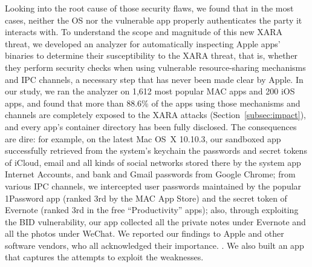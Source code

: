 \documentclass{article}
\newcommand{\ignore}[1]{}
\begin{document}
Looking into the root cause of those security flaws, we found that in the most cases, neither the OS nor the vulnerable app properly authenticates the party it interacts with\ignore{talks to}. To understand the scope and magnitude of this new XARA threat, we developed an analyzer for automatically inspecting Apple apps' binaries to determine their susceptibility to the XARA threat, that is, whether they perform security checks when using vulnerable resource-sharing mechanisms and IPC channels, a necessary step that has never been made clear by Apple. In our study, we ran the analyzer on 1,612 most popular MAC apps and 200 iOS apps, and found that more than 88.6\% of the apps using those mechanisms and channels are completely exposed to the XARA attacks (Section~\ref{subsec:impact}), and every app's container directory has been fully disclosed. The consequences are dire: for example, on the latest Mac OS~X 10.10.3, our sandboxed app successfully retrieved from the system's keychain the passwords and secret tokens of iCloud, email and all kinds of social networks stored there by the system app Internet Accounts, and bank and Gmail passwords from Google Chrome; from various IPC channels, we intercepted user passwords maintained by the popular 1Password app (ranked 3rd by the MAC App Store) and the secret token of Evernote (ranked 3rd in the free ``Productivity'' apps); also, through exploiting the BID vulnerability, our app collected all the private notes under Evernote and all the photos under WeChat\ignore{ even replaced the extension installer of Dashlane, another popular password manager, with malicious code}.  We reported our findings to Apple and other software vendors, who all acknowledged their importance.  \ignore{The video demos of our attacks and our communication with the related parties are posted on a private website~\cite{supporting}\footnote{\small We do not track the visitor.}}. We also built an app that captures the attempts to exploit the weaknesses.
\end{document}
